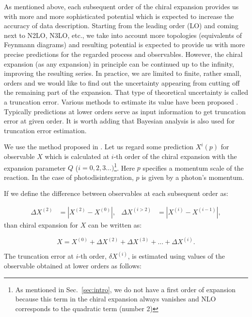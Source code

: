     As mentioned above, each subsequent order of the chiral
    expansion provides us with more and more sophisticated
    potential which is expected to increase the accuracy of data description.
    Starting from the leading order (LO) and coming next to
    N2LO, N3LO, etc., we take into account more topologies (equivalents of Feynmann diagrams) 
    and resulting potential is expected to provide us with more precise predictions
    for the regarded process and observables. However, the chiral expansion (as any expansion) 
    in principle can be continued up to the infinity, improving the resulting series.
    In practice, we are limited to finite, rather small, orders 
    and we would like to find out
    the uncertainty appearing from cutting off the remaining part of the expansion.
    That type of theoretical uncertainty is called a truncation error. 
    Various methods to estimate its value
    have been proposed \cite{Epelbaum2014SCS, Epelbaum2015_trunc, Binder2015, Epelbaum_pos, Miller_arxiv}.
    Typically predictions at lower orders serve as input information to get truncation error at given order.
    It is worth adding that Bayesian analysis is also used for truncation error estimation.

    We use the method proposed in \cite{Binder2015}.
    Let us regard some prediction $X^i(p)$ for observable $X$ which is calculated
    at $i$-th order of the chiral expansion 
    with the expansion parameter $Q$ ($i = 0,2,3...)$\footnote{As mentioned in Sec.~\ref{sec:intro}, we do not have a first order of expansion
    because this term in the chiral expansion always vanishes
    and NLO  corresponds to the quadratic term (number 2)}.
    Here $p$ specifies a momentum
    scale of the reaction. In the case of photodisintegration, $p$ is given by a
    photon's momentum.  

    If we define the difference between observables at each subsequent order as:

    \begin{align}
        \Delta X^{(2)} &= |X^{(2)} - X^{(0)}|,& \Delta X^{(i>2)} &= |X^{(i)} - X^{(i-1)}|,
    \end{align}
    than chiral expansion for $X$ can be written as:

    \begin{equation}
        X = X^{(0)} + \Delta X^{(2)} + \Delta X^{(3)} + ... + \Delta X^{(i)}.
        \label{trunc1}
    \end{equation}
        
    The truncation error at $i$-th order, $\delta X^{(i)}$, is estimated using
     values of the observable obtained at lower 
    orders as follows:

